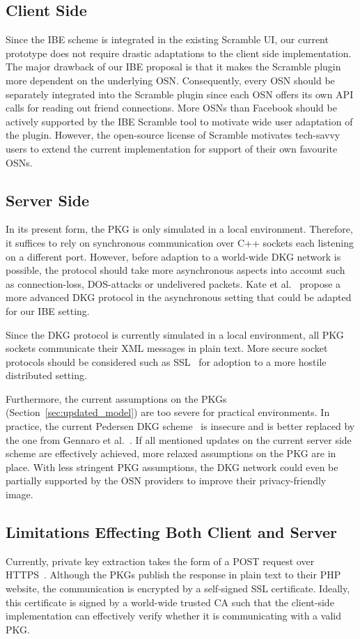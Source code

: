 \subsection{Client Side}
Since the IBE scheme is integrated in the existing Scramble UI, our current prototype does not require drastic adaptations to the client side implementation. The major drawback of our IBE proposal is that it makes the Scramble plugin more dependent on the underlying OSN. Consequently, every OSN should be separately integrated into the Scramble plugin since each OSN offers its own API calls for reading out friend connections. More OSNs than Facebook should be actively supported by the IBE Scramble tool to motivate wide user adaptation of the plugin. However, the open-source license of Scramble motivates tech-savvy users to extend the current implementation for support of their own favourite OSNs. 

\subsection{Server Side}
In its present form, the PKG is only simulated in a local environment. Therefore, it suffices to rely on synchronous communication over C++ sockets each listening on a different port. However, before adaption to a world-wide DKG network is possible, the protocol should take more asynchronous aspects into account such as connection-loss, DOS-attacks or undelivered packets. Kate et al.~\cite{art:KateHG12} propose a more advanced DKG protocol in the asynchronous setting that could be adapted for our IBE setting.

Since the DKG protocol is currently simulated in a local environment, all PKG sockets communicate their XML messages in plain text. More secure socket protocols should be considered such as SSL~\cite{rfc6101} for adoption to a more hostile distributed setting.

Furthermore, the current assumptions on the PKGs (Section~\ref{sec:updated_model}) are too severe for practical environments. In practice, the current Pedersen DKG scheme~\cite{art:Pedersen91a} is insecure and is better replaced by the one from Gennaro et al.~\cite{art:GennaroJKR07}. If all mentioned updates on the current server side scheme are effectively achieved, more relaxed assumptions on the PKG are in place. With less stringent PKG assumptions, the DKG network could even be partially supported by the OSN providers to improve their privacy-friendly image.

\subsection{Limitations Effecting Both Client and Server}
Currently, private key extraction takes the form of a POST request over HTTPS~\cite{rfc2818}. Although the PKGs publish the response in plain text to their PHP website, the communication is encrypted by a self-signed SSL certificate. Ideally, this certificate is signed by a world-wide trusted CA such that the client-side implementation can effectively verify whether it is communicating with a valid PKG.

